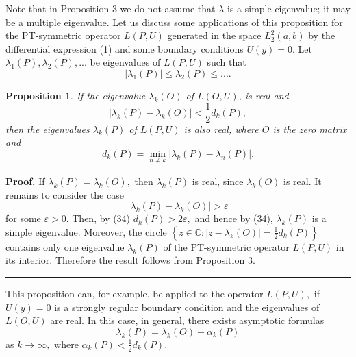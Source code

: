 \documentclass{article}%
\newtheorem{proposition}{Proposition}
\newenvironment{proof}[1][Proof]{\textbf{#1.} }{\ \rule{0.5em}{0.5em}}
\begin{document}
Note that in Proposition 3 we do not assume that $\lambda$ is a simple
eigenvalue; it may be a multiple eigenvalue. Let us discuss some applications
of this proposition for the PT-symmetric operator $L(P,U)$ generated in the
space $L_{2}^{2}(a,b)$ by the differential expression (1) and some boundary
conditions $U(y)=0.$ Let $\lambda_{1}(P),\lambda_{2}(P),...$ be eigenvalues of
$L(P,U)$ such that
\begin{equation}
\left\vert \lambda_{1}(P)\right\vert \leq\lambda_{2}(P)\leq.... \tag{33}%
\end{equation}


\begin{proposition}
If the eigenvalue $\lambda_{k}(O)$ of $L(O,U)$, is real and
\begin{equation}
\left\vert \lambda_{k}(P)-\lambda_{k}(O)\right\vert <\frac{1}{2}d_{k}(P),
\tag{34}%
\end{equation}
then the eigenvalues $\lambda_{k}(P)$ of $L(P,U)$ is also real, where $O$ is
the zero matrix and
\[
d_{k}(P)=\min_{n\neq k}\left\vert \lambda_{k}(P)-\lambda_{n}(P)\right\vert .
\]

\end{proposition}

\begin{proof}
If $\lambda_{k}(P)=\lambda_{k}(O),$ then $\lambda_{k}(P)$ is real, since
$\lambda_{k}(O)$ is real. It remains to consider the case%
\[
\left\vert \lambda_{k}(P)-\lambda_{k}(O)\right\vert >\varepsilon
\]
for some $\varepsilon>0.$ Then, by (34) $d_{k}(P)>2\varepsilon,$ and hence by
(34), $\lambda_{k}(P)$ is a simple eigenvalue. Moreover, the circle $\left\{
z\in\mathbb{C}:\left\vert z-\lambda_{k}(O)\right\vert =\frac{1}{2}%
d_{k}(P)\right\}  $ contains only one eigenvalue $\lambda_{k}(P)$ of the
PT-symmetric operator $L(P,U)$ in its interior. Therefore the result follows
from Proposition 3.
\end{proof}

This proposition can, for example, be applied to the operator $L(P,U),$ if
$U(y)=0$ is a strongly regular boundary condition and the eigenvalues of
$L(O,U)$ are real. In this case, in general, there exists asymptotic formulas
\[
\lambda_{k}(P)=\lambda_{k}(O)+\alpha_{k}(P)
\]
as $k\rightarrow\infty,$ where $\alpha_{k}(P)<\frac{1}{2}d_{k}(P)$.
\end{document}
